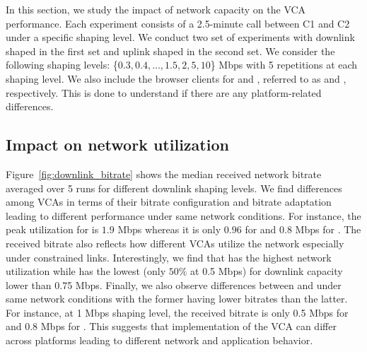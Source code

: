 In this section, we study the impact of network capacity on the VCA performance. Each experiment consists of a 2.5-minute call between C1 and C2 under a specific shaping level. We conduct two set of experiments with downlink shaped in the first set and uplink shaped in the second set. We consider the following shaping levels: \{$0.3, 0.4, \dots, 1.5, 2, 5, 10$\} Mbps with 5 repetitions at each shaping level.  We also include the browser clients for \zoom and \teams, referred to as \zoombrowser and \teamsbrowser, respectively. This is done to understand if there are any platform-related differences. 




\subsection{Impact on network utilization} Figure~\ref{fig:downlink_bitrate} shows the median received network bitrate averaged over 5 runs for different downlink shaping levels. We find differences among VCAs in terms of their bitrate configuration and bitrate adaptation leading to different performance under same network conditions. For instance, the peak utilization for \teamsnative is $1.9$ Mbps whereas it is only $0.96$ for \zoomnative and $0.8$ Mbps for \meet. The received bitrate also reflects how different VCAs utilize the network especially under constrained links. Interestingly, we find that \zoomnative has the highest network utilization while \meet has the lowest (only $50\%$ at 0.5 Mbps) for downlink capacity lower than 0.75 Mbps. Finally, we also observe differences between \teamsbrowser and \teamsnative under same network conditions with the former having lower bitrates than the latter. For instance, at 1 Mbps shaping level, the received bitrate is only 0.5 Mbps for \teamsbrowser and 0.8 Mbps for \teamsnative. This suggests that implementation of the VCA can differ across platforms leading to different network and application behavior. 

